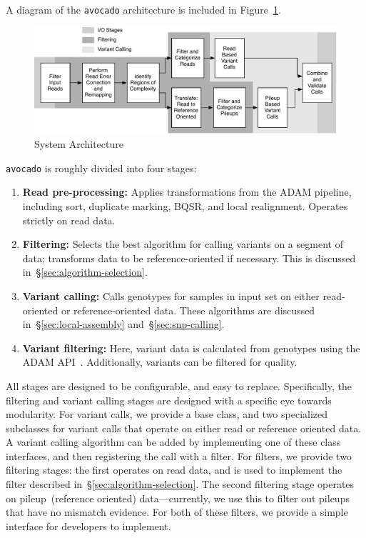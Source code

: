\documentclass{acm_proc_article-sp}
\begin{document}
A diagram of the \texttt{avocado} architecture is included in Figure~\ref{fig:architecture}.

\begin{figure}[h]
\begin{center}
\includegraphics[width=0.9\linewidth]{avocado-architecture.pdf}
\end{center}
\caption{System Architecture}
\label{fig:architecture}
\end{figure}

\texttt{avocado} is roughly divided into four stages:

\begin{enumerate}
\item \textbf{Read pre-processing:} Applies transformations from the ADAM pipeline, including sort, duplicate marking, BQSR, and
local realignment. Operates strictly on read data.
\item \textbf{Filtering:} Selects the best algorithm for calling variants on a segment of data; transforms data to be reference-oriented
if necessary. This is discussed in~\S\ref{sec:algorithm-selection}.
\item \textbf{Variant calling:} Calls genotypes for samples in input set on either read-oriented or reference-oriented data. These
algorithms are discussed in~\S\ref{sec:local-assembly} and~\S\ref{sec:snp-calling}.
\item \textbf{Variant filtering:} Here, variant data is calculated from genotypes using the ADAM API~\cite{massie13}. Additionally,
variants can be filtered for quality.
\end{enumerate}

All stages are designed to be configurable, and easy to replace. Specifically, the filtering and variant calling stages are designed
with a specific eye towards modularity. For variant calls, we provide a base class, and two specialized subclasses for variant
calls that operate on either read or reference oriented data. A variant calling algorithm can be added by implementing one
of these class interfaces, and then registering the call with a filter. For filters, we provide two filtering stages: the first operates
on read data, and is used to implement the filter described in~\S\ref{sec:algorithm-selection}. The second filtering stage operates
on pileup~(reference oriented) data---currently, we use this to filter out pileups that have no mismatch evidence. For both of these
filters, we provide a simple interface for developers to implement.
\end{document}
